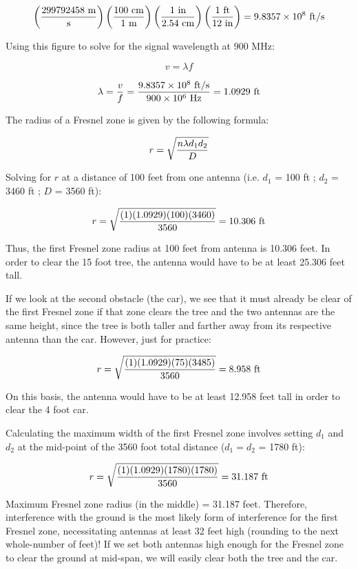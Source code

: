 $$\left(299792458 \hbox{ m} \over \hbox{s} \right) \left(100 \hbox{ cm} \over 1 \hbox{ m} \right) \left(1 \hbox{ in} \over 2.54 \hbox{ cm} \right)  \left(1 \hbox{ ft} \over 12 \hbox{ in} \right) = 9.8357 \times 10^{8} \hbox{ ft/s}$$

Using this figure to solve for the signal wavelength at 900 MHz:

$$v = \lambda f$$

$$\lambda = {v \over f} = {9.8357 \times 10^{8} \hbox{ ft/s} \over 900 \times 10^6 \hbox{ Hz}} = 1.0929 \hbox{ ft}$$

\vskip 10pt

The radius of a Fresnel zone is given by the following formula:

$$r = \sqrt{{n \lambda d_1 d_2} \over D}$$

\vskip 10pt

Solving for $r$ at a distance of 100 feet from one antenna (i.e. $d_1$ = 100 ft ; $d_2$ = 3460 ft ; $D$ = 3560 ft):

$$r = \sqrt{{(1) (1.0929) (100) (3460)} \over 3560} = 10.306 \hbox{ ft}$$

Thus, the first Fresnel zone radius at 100 feet from antenna is 10.306 feet.  In order to clear the 15 foot tree, the antenna would have to be at least 25.306 feet tall.

\vskip 10pt

If we look at the second obstacle (the car), we see that it must already be clear of the first Fresnel zone if that zone clears the tree and the two antennas are the same height, since the tree is both taller and farther away from its respective antenna than the car.  However, just for practice:

$$r = \sqrt{{(1) (1.0929) (75) (3485)} \over 3560} = 8.958 \hbox{ ft}$$

On this basis, the antenna would have to be at least 12.958 feet tall in order to clear the 4 foot car.

\vskip 10pt

Calculating the maximum width of the first Fresnel zone involves setting $d_1$ and $d_2$ at the mid-point of the 3560 foot total distance ($d_1 = d_2$ = 1780 ft):

$$r = \sqrt{{(1) (1.0929) (1780) (1780)} \over 3560} = 31.187 \hbox{ ft}$$

Maximum Fresnel zone radius (in the middle) = 31.187 feet.  Therefore, interference with the ground is the most likely form of interference for the first Fresnel zone, necessitating antennas at least 32 feet high (rounding to the next whole-number of feet)!  If we set both antennas high enough for the Fresnel zone to clear the ground at mid-span, we will easily clear both the tree and the car.












